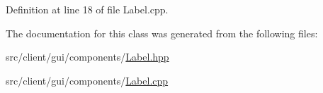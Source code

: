 Definition at line 18 of file Label.\+cpp.



The documentation for this class was generated from the following files\+:\begin{DoxyCompactItemize}
\item 
src/client/gui/components/\mbox{\hyperlink{_label_8hpp}{Label.\+hpp}}\item 
src/client/gui/components/\mbox{\hyperlink{_label_8cpp}{Label.\+cpp}}\end{DoxyCompactItemize}
